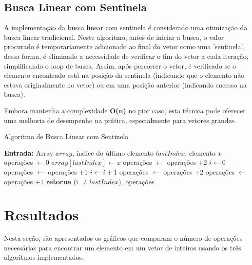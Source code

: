 \documentclass[12pt]{article}
\begin{document}
\subsection{Busca Linear com Sentinela}
A implementação da busca linear com sentinela é considerado uma otimização da busca linear tradicional. Neste algoritmo, antes de iniciar a busca, o valor procurado é temporariamente adicionado ao final do vetor como uma 'sentinela', dessa forma, é eliminado a necessidade de verificar o fim do vetor a cada iteração, simplificando o loop de busca. Assim, após percorrer o vetor, é verificado se o elemento encontrado está na posição da sentinela (indicando que o elemento não estava originalmente no vetor) ou em uma posição anterior (indicando sucesso na busca). 

Embora mantenha a complexidade \textbf{O(n)} no pior caso, esta técnica pode oferecer uma melhoria de desempenho na prática, especialmente para vetores grandes.

\begin{algorithm}
    \caption{Algoritmo de Busca Linear com Sentinela}
    \label{alg:estruturaDeDados_GD}
    \begin{algorithmic}
        \State \textbf{Entrada:} Array $array$, índice do último elemento $lastIndex$, elemento $x$
        \State operações $\gets 0$
        \State $array[lastIndex] \gets x$
        \State operações $\gets$ operações $+ 2$
        \State $i \gets 0$
        \State operações $\gets$ operações $+ 1$
            \State $i \gets i + 1$
            \State operações $\gets$ operações $+ 2$
        \EndWhile
        \State operações $\gets$ operações $+ 1$
        \State \textbf{retorna} (i $\neq lastIndex$), operações
    \end{algorithmic}
\end{algorithm}

\section{Resultados}

Nesta seção, são apresentados os gráficos que comparam o número de operações necessárias para encontrar um elemento em um vetor de inteiros usando os três algoritmos implementados.
\end{document}
